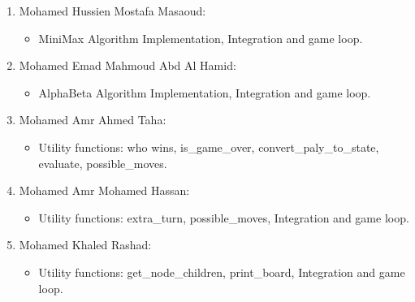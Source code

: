 \begin{enumerate}
    \item Mohamed Hussien Mostafa Masaoud:
    \begin{itemize}
        \item MiniMax  Algorithm Implementation, Integration and game loop.
    \end{itemize} 
    \vskip 0.2in
    \item Mohamed Emad Mahmoud Abd Al Hamid:
     \begin{itemize}
        \item AlphaBeta  Algorithm Implementation, Integration and game loop.
    \end{itemize}
    \item Mohamed Amr Ahmed Taha:
    \begin{itemize}
        \item Utility functions: who wins, is\_game\_over, convert\_paly\_to\_state, evaluate, possible\_moves.
    \end{itemize} 
    \item Mohamed Amr Mohamed Hassan:
    \begin{itemize}
        \item Utility functions: extra\_turn, possible\_moves, Integration and game loop.
    \end{itemize}
    \item Mohamed Khaled Rashad:  
   \begin{itemize}
        \item Utility functions: get\_node\_children, print\_board, Integration and game loop.
    \end{itemize}
\end{enumerate}